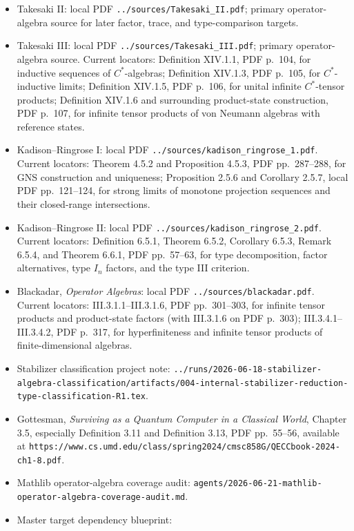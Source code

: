 \documentclass{article}
\begin{document}
\begin{itemize}
tensor product of represented bicommutants.
\item Takesaki II: local PDF \texttt{../sources/Takesaki\_II.pdf}; primary
operator-algebra source for later factor, trace, and type-comparison targets.
\item Takesaki III: local PDF \texttt{../sources/Takesaki\_III.pdf}; primary
operator-algebra source.  Current locators: Definition XIV.1.1, PDF p.~104,
for inductive sequences of \(C^*\)-algebras; Definition XIV.1.3, PDF p.~105,
for \(C^*\)-inductive limits; Definition XIV.1.5, PDF p.~106, for unital
infinite \(C^*\)-tensor products; Definition XIV.1.6 and surrounding
product-state construction, PDF p.~107, for infinite tensor products of
von Neumann algebras with reference states.
\item Kadison--Ringrose I: local PDF
\texttt{../sources/kadison\_ringrose\_1.pdf}.  Current locators: Theorem 4.5.2
and Proposition 4.5.3, PDF pp.~287--288, for GNS construction and uniqueness;
Proposition 2.5.6 and Corollary 2.5.7, local PDF pp.~121--124, for strong
limits of monotone projection sequences and their closed-range intersections.
\item Kadison--Ringrose II: local PDF
\texttt{../sources/kadison\_ringrose\_2.pdf}.  Current locators: Definition
6.5.1, Theorem 6.5.2, Corollary 6.5.3, Remark 6.5.4, and Theorem 6.6.1,
PDF pp.~57--63, for type decomposition, factor alternatives, type \(I_n\)
factors, and the type III criterion.
\item Blackadar, \emph{Operator Algebras}: local PDF
\texttt{../sources/blackadar.pdf}.  Current locators: III.3.1.1--III.3.1.6,
PDF pp.~301--303, for infinite tensor products and product-state factors
(with III.3.1.6 on PDF p.~303);
III.3.4.1--III.3.4.2, PDF p.~317, for hyperfiniteness and infinite tensor
products of finite-dimensional algebras.
\item Stabilizer classification project note:
\texttt{../runs/2026-06-18-stabilizer-algebra-classification/artifacts/004-internal-stabilizer-reduction-type-classification-R1.tex}.
\item Gottesman, \emph{Surviving as a Quantum Computer in a Classical World},
Chapter 3.5, especially Definition 3.11 and Definition 3.13, PDF
pp.~55--56, available at
\texttt{https://www.cs.umd.edu/class/spring2024/cmsc858G/QECCbook-2024-ch1-8.pdf}.
\item Mathlib operator-algebra coverage audit:
\texttt{agents/2026-06-21-mathlib-operator-algebra-coverage-audit.md}.
\item Master target dependency blueprint:

\end{itemize}
\end{document}
